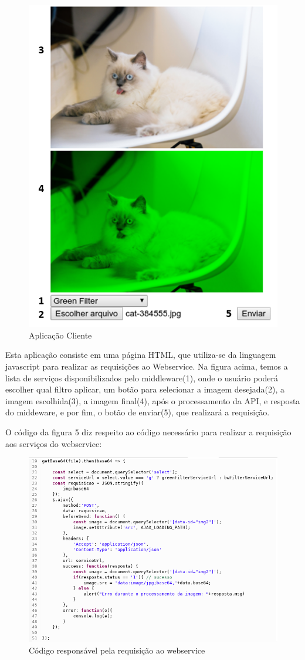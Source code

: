 \documentclass[12pt]{article}
\begin{document}
\begin{figure}[ht]
	\centering
	\includegraphics[width=.7\textwidth]{aplicacao-cliente.png}
	\caption{Aplicação Cliente}
	\label{fig:Figura4}
\end{figure}

Esta aplicação consiste em uma página HTML, que utiliza-se da linguagem javascript para realizar as requisições ao Webservice. Na figura acima, temos a lista de serviços disponibilizados pelo middleware(1), onde o usuário poderá escolher qual filtro aplicar, um botão para selecionar a imagem desejada(2), a imagem escolhida(3), a imagem final(4), após o processamento da API, e resposta do middeware, e por fim, o botão de enviar(5), que realizará a requisição.

O código da figura 5 diz respeito ao código necessário para realizar a requisição aos serviços do webservice:

\begin{figure}[ht]
	\centering
	\includegraphics[width=.9\textwidth]{cliente-requisicao.png}
	\caption{Código responsável pela requisição ao webservice}
	\label{fig:Figura5}
\end{figure}
\end{document}
